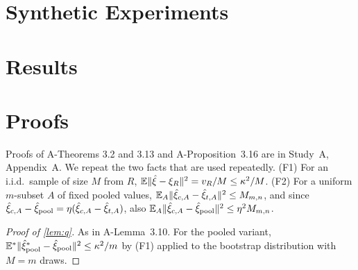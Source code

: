 \documentclass[11pt,a4paper]{article}
\begin{document}
\section{Synthetic Experiments}\label{sec:experiments}


\section{Results}\label{sec:results}


\appendix
\section{Proofs}\label{app:proofs}

Proofs of A-Theorems 3.2 and 3.13 and A-Proposition~3.16 are in Study~A, Appendix~A. We repeat the two facts that are used repeatedly. (F1) For an i.i.d.\ sample of size $M$ from $R$, $\mathbb{E}\lVert \hat\xi-\xi_R\rVert^2=v_R/M\le\kappa^2/M$. (F2) For a uniform $m$-subset $A$ of fixed pooled values, $\mathbb{E}_A\lVert \hat\xi_{c,A}-\hat\xi_{t,A}\rVert^2\le M_{m,n}$, and since $\hat\xi_{c,A}-\hat\xi_{\rm pool}=\eta(\hat\xi_{c,A}-\hat\xi_{t,A})$, also $\mathbb{E}_A\lVert \hat\xi_{c,A}-\hat\xi_{\rm pool}\rVert^2\le\eta^2M_{m,n}$.

\begin{proof}[Proof of \cref{lem:q}]
As in A-Lemma~3.10. For the pooled variant, $\mathbb{E}^\ast\lVert \hat\xi^\ast_{\rm pool}-\hat\xi_{\rm pool}\rVert^2\le\kappa^2/m$ by (F1) applied to the bootstrap distribution with $M=m$ draws.
\end{proof}
\end{document}
